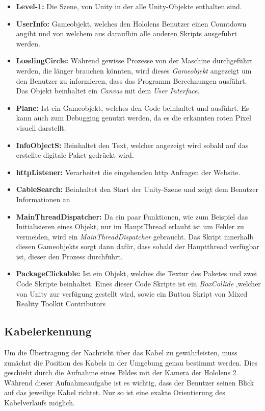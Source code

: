 \begin{itemize}
    \item \textbf{Level-1:} Die Szene, von Unity in der alle Unity-Objekte enthalten sind.
    \item \textbf{UserInfo:} Gameobjekt, welches den Hololens Benutzer einen Countdown angibt und von welchem aus daraufhin alle anderen Skripts ausgeführt werden.
    \item \textbf{LoadingCircle:} Während gewisse Prozesse von der Maschine durchgeführt werden, die länger brauchen könnten, wird dieses \textit{Gameobjekt} angezeigt um den Benutzer zu informieren, dass das Programm Berechnungen ausführt. Das Objekt beinhaltet ein \textit{Canvas} mit dem \textit{User Interface}.
    \item \textbf{Plane:} Ist ein Gameobjekt, welches den Code beinhaltet und ausführt. Es kann auch zum Debugging genutzt werden, da es die erkannten roten Pixel visuell darstellt.
    \item \textbf{InfoObjectS:} Beinhaltet den Text, welcher angezeigt wird sobald auf das erstellte digitale Paket gedrückt wird.
    \item \textbf{httpListener:} Verarbeitet die eingehenden http Anfragen der Website.
    \item \textbf{CableSearch:} Beinhaltet den Start der Unity-Szene und zeigt dem Benutzer Informationen an
    \item \textbf{MainThreadDispatcher: } Da ein paar Funktionen, wie zum Beispiel das Initialisieren eines Objekt, nur im HauptThread erlaubt ist um Fehler zu vermeiden, wird ein \textit{MainThreadDispatcher} gebraucht. Das Skript innerhalb diesen Gameobjekts sorgt dann dafür, dass sobald der Hauptthread verfügbar ist, dieser den Prozess durchführt.
    \item \textbf{PackageClickable:} Ist ein Objekt, welches die Textur des Paketes und zwei Code Skripte beinhaltet. Eines dieser Code Skripte ist ein \textit{BoxCollide } ,welcher von Unity zur verfügung gestellt wird, sowie ein Button Skript von Mixed Reality Toolkit Contributors
\end{itemize}

\subsection{Kabelerkennung}
Um die Übertragung der Nachricht über das Kabel zu gewährleisten, muss zunächst die Position des Kabels in der Umgebung genau bestimmt werden. Dies geschieht durch die Aufnahme eines Bildes mit der Kamera der Hololens 2. Während dieser Aufnahmeaufgabe ist es wichtig, dass der Benutzer seinen Blick auf das jeweilige Kabel richtet. Nur so ist eine exakte Orientierung des Kabelverlaufs möglich.

